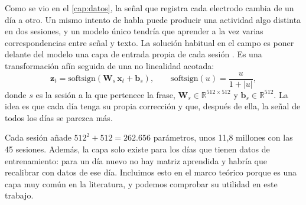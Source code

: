 Como se vio en el \cref{cap:datos}, la señal que registra cada electrodo cambia de un día a otro. Un mismo intento de habla puede producir una actividad algo distinta en dos sesiones, y un modelo único tendría que aprender a la vez varias correspondencias entre señal y texto. La solución habitual en el campo es poner delante del modelo una capa de entrada propia de cada sesión \cite{willett2021,willett2023}. Es una transformación afín seguida de una no linealidad acotada:
\begin{equation}
  \mathbf{z}_t = \mathrm{softsign}\left( \mathbf{W}_{s}\,\mathbf{x}_t + \mathbf{b}_{s} \right), \qquad \mathrm{softsign}(u) = \frac{u}{1+|u|},
  \label{eq:capa-sesion}
\end{equation}
donde $s$ es la sesión a la que pertenece la frase, $\mathbf{W}_{s} \in \mathbb{R}^{512 \times 512}$ y $\mathbf{b}_{s} \in \mathbb{R}^{512}$. La idea es que cada día tenga su propia corrección y que, después de ella, la señal de todos los días se parezca más. 

Cada sesión añade $512^2 + 512 = 262.656$ parámetros, unos 11,8 millones con las 45 sesiones. Además, la capa solo existe para los días que tienen datos de entrenamiento: para un día nuevo no hay matriz aprendida y habría que recalibrar con datos de ese día. Incluimos esto en el marco teórico porque es una capa muy común en la literatura, y podemos comprobar su utilidad en este trabajo.

